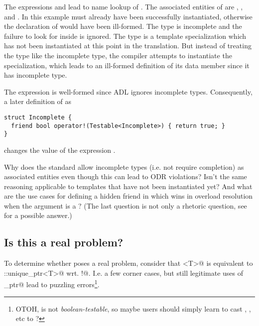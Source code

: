 The expressions  and  lead to name lookup of . The 
associated entities of  are , 
, and .
In this example  must already have been successfully 
instantiated, otherwise the declaration of  would have been ill-formed.
The type  is incomplete and the failure to look for  
inside  is ignored.
The type  is a template specialization which has not been 
instantiated at this point in the translation. But instead of treating the type like the 
incomplete  type, the compiler attempts to instantiate the 
specialization, which leads to an ill-formed definition of its data member since it has 
incomplete type.

The expression  is well-formed since ADL ignores incomplete types. Consequently, 
a later definition of  as
\medskip\begin{lstlisting}[style=Vc]
struct Incomplete {
  friend bool operator!(Testable<Incomplete>) { return true; }
}
\end{lstlisting}
changes the value of the expression .

Why does the standard allow incomplete types (i.e. not require completion) as associated 
entities even though this can lead to ODR violations? Isn't the same reasoning applicable 
to templates that have not been instantiated yet? And what are the use cases for defining 
a hidden friend in  which wins in overload resolution when the 
argument is a ? (The last question is not only a rhetoric 
question, see  for a possible answer.)

\subsection{Is this a real problem?}

To determine whether  poses a real problem, consider that 
\codelst@Testable<T>@ is equivalent to \codelst@std::unique_ptr<T>@ wrt. 
\codelst@operator!@. I.e. a few corner cases, but still legitimate uses of 
\codelst@unique_ptr@ lead to puzzling errors\footnote{OTOH,  is not 
\emph{boolean-testable}, so maybe users should simply learn to cast , 
, etc to ?}.

